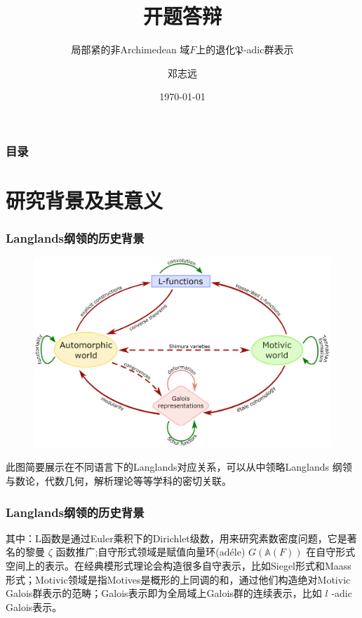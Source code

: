 \documentclass[aspectratio=169]{beamer}
\author{邓志远}
\title{开题答辩}
\subtitle{局部紧的非Archimedean 域$F$上的退化$\mathfrak{P}$-adic群表示}
\date{\today}
\begin{document}
\frame[plain]{\titlepage}

\begin{frame}
\frametitle{目录}
\tableofcontents
\end{frame}

\section{研究背景及其意义}


\begin{frame}
\frametitle{Langlands纲领的历史背景}

\begin{figure}[ht]
\includegraphics[scale=0.12]{LAMG.jpg}
\end{figure}

此图简要展示在不同语言下的Langlands对应关系，可以从中领略Langlands 纲领与数论，代数几何，解析理论等等学科的密切关联。
\end{frame}
\begin{frame}
\frametitle{Langlands纲领的历史背景}
其中：L函数是通过Euler乘积下的Dirichlet级数，用来研究素数密度问题，它是著名的黎曼 $\zeta$ 函数推广;自守形式领域是赋值向量环(ad\'{e}le) $G(\mathbb{A}(F))$ 在自守形式空间上的表示。在经典模形式理论会构造很多自守表示，比如Siegel形式和Maass形式；Motivic领域是指Motives是概形的上同调的和，通过他们构造绝对Motivic Galois群表示的范畴；Galois表示即为全局域上Galois群的连续表示，比如 $l$ -adic Galois表示。
\end{frame}
\end{document}
